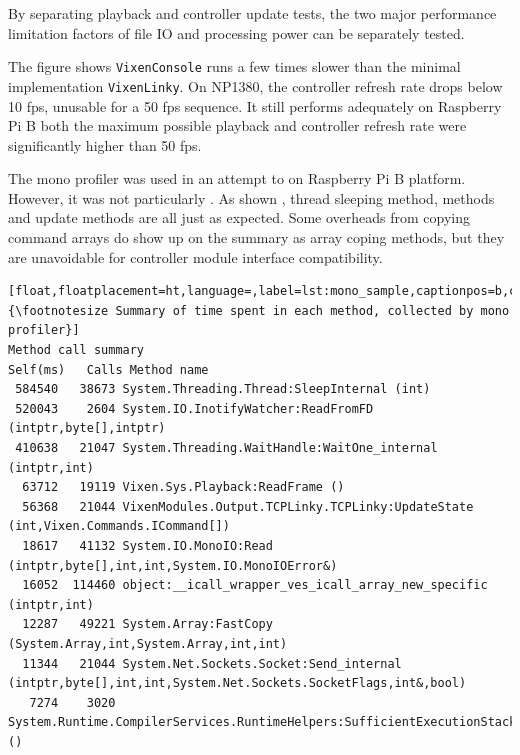 By separating playback and controller update tests, the two major performance limitation factors of file IO and processing power can be separately tested.

The figure shows  \texttt{VixenConsole} runs a few times slower than the minimal implementation \texttt{VixenLinky}. On NP1380, the controller refresh rate drops below 10 fps, unusable for a 50 fps sequence. It still performs adequately on Raspberry Pi B\ca{;} both the maximum possible playback and controller refresh rate were significantly higher than 50 fps.


The mono profiler was used in an attempt to  on  Raspberry Pi B platform. However, it was not particularly . As shown  ,  thread sleeping method,  methods and update methods are all  just as expected. Some overheads from copying command arrays do show up on the summary as array coping methods, but they are  unavoidable for controller module interface compatibility.

\begin{lstlisting}[float,floatplacement=ht,language=,label=lst:mono_sample,captionpos=b,caption={\footnotesize Summary of time spent in each method, collected by mono profiler}]
Method call summary
Self(ms)   Calls Method name
 584540   38673 System.Threading.Thread:SleepInternal (int)
 520043    2604 System.IO.InotifyWatcher:ReadFromFD (intptr,byte[],intptr)
 410638   21047 System.Threading.WaitHandle:WaitOne_internal (intptr,int)
  63712   19119 Vixen.Sys.Playback:ReadFrame ()
  56368   21044 VixenModules.Output.TCPLinky.TCPLinky:UpdateState (int,Vixen.Commands.ICommand[])
  18617   41132 System.IO.MonoIO:Read (intptr,byte[],int,int,System.IO.MonoIOError&)
  16052  114460 object:__icall_wrapper_ves_icall_array_new_specific (intptr,int)
  12287   49221 System.Array:FastCopy (System.Array,int,System.Array,int,int)
  11344   21044 System.Net.Sockets.Socket:Send_internal (intptr,byte[],int,int,System.Net.Sockets.SocketFlags,int&,bool)
   7274    3020 System.Runtime.CompilerServices.RuntimeHelpers:SufficientExecutionStack ()
\end{lstlisting}

